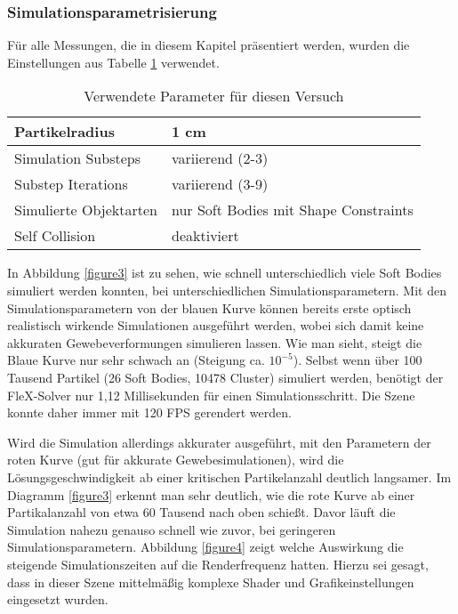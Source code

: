\subsubsection{Simulationsparametrisierung}

Für alle Messungen, die in diesem Kapitel präsentiert werden, wurden die Einstellungen aus Tabelle \ref{table_soft_param} verwendet.

\begin{table}[hbt!]
\centering
\caption{Verwendete Parameter für diesen Versuch}
\label{table_soft_param}
\begin{tabular}{l|l}
 \hline
Partikelradius & 1 cm  \\ \hline
Simulation Substeps & variierend (2-3)      \\ \hline
Substep Iterations & variierend (3-9)            \\ \hline
Simulierte Objektarten &  nur Soft Bodies mit Shape Constraints\\ \hline
Self Collision & deaktiviert \\ \hline%
\end{tabular}
\end{table}


In Abbildung \ref{figure3} ist zu sehen, wie schnell unterschiedlich viele Soft Bodies simuliert werden konnten, bei unterschiedlichen Simulationsparametern. %
Mit den Simulationsparametern von der blauen Kurve können bereits erste optisch realistisch wirkende Simulationen ausgeführt werden, wobei sich damit keine akkuraten Gewebeverformungen simulieren lassen. Wie man sieht, steigt die Blaue Kurve nur sehr schwach an (Steigung ca. $10^{-5}$). Selbst wenn über 100 Tausend Partikel (26 Soft Bodies, 10478 Cluster) simuliert werden, benötigt der FleX-Solver nur 1,12 Millisekunden für einen Simulationsschritt. Die Szene konnte daher immer mit 120 FPS gerendert werden.
\clearpage
{}

Wird die Simulation allerdings akkurater ausgeführt, mit den Parametern der roten Kurve (gut für akkurate Gewebesimulationen), wird die Lösungsgeschwindigkeit ab einer kritischen Partikelanzahl deutlich langsamer. Im Diagramm \ref{figure3} erkennt man sehr deutlich, wie die rote Kurve ab einer Partikalanzahl von etwa 60 Tausend nach oben schießt. Davor läuft die Simulation nahezu genauso schnell wie zuvor, bei geringeren Simulationsparametern.
Abbildung \ref{figure4} zeigt welche Auswirkung die steigende Simulationszeiten auf die Renderfrequenz hatten. Hierzu sei gesagt, dass in dieser Szene mittelmäßig komplexe Shader und Grafikeinstellungen eingesetzt wurden.

